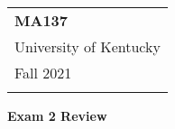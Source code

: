 \documentclass[a4paper,12pt]{article} %
\theoremstyle{plain}
\theoremstyle{definition}
\begin{document}
\thispagestyle{empty} %

\begin{tabular}{p{15.5cm}} %
{\large \bf MA137} \\
University of Kentucky \\ Fall 2021 \\
\hline %
\\
\end{tabular} %

\vspace*{0.3cm} %

\begin{center} %
	{\Large \bf Exam 2 Review} %
	\vspace{2mm}
	
\end{center}  

\vspace{0.4cm}
\end{document}
